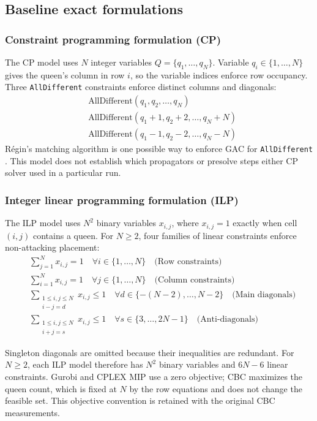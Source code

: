 \documentclass[a4paper,fleqn]{cas-sc}
\begin{document}
\subsection{Baseline exact formulations}

\subsubsection{Constraint programming formulation (CP)}
The CP model uses $N$ integer variables $Q=\{q_1,\dots,q_N\}$. Variable $q_i\in\{1,\dots,N\}$ gives the queen's column in row $i$, so the variable indices enforce row occupancy. Three \texttt{AllDifferent} constraints enforce distinct columns and diagonals:
\begin{align}
& \text{AllDifferent}(q_1, q_2, \dots, q_N) \\
& \text{AllDifferent}(q_1 + 1, q_2 + 2, \dots, q_N + N) \\
& \text{AllDifferent}(q_1 - 1, q_2 - 2, \dots, q_N - N)
\end{align}
Régin's matching algorithm is one possible way to enforce GAC for \texttt{AllDifferent} \cite{regin1994filtering}. This model does not establish which propagators or presolve steps either CP solver used in a particular run.

\subsubsection{Integer linear programming formulation (ILP)}
The ILP model uses $N^2$ binary variables $x_{i,j}$, where $x_{i,j}=1$ exactly when cell $(i,j)$ contains a queen. For $N\geq2$, four families of linear constraints enforce non-attacking placement:
\begin{align}
& \sum_{j=1}^{N} x_{i,j} = 1 \quad \forall i \in \{1, \dots, N\} \quad \text{(Row constraints)} \\
& \sum_{i=1}^{N} x_{i,j} = 1 \quad \forall j \in \{1, \dots, N\} \quad \text{(Column constraints)} \\
& \sum_{\substack{1 \leq i, j \leq N \\ i - j = d}} x_{i,j} \leq 1 \quad \forall d \in \{-(N-2), \dots, N-2\} \quad \text{(Main diagonals)} \\
& \sum_{\substack{1 \leq i, j \leq N \\ i + j = s}} x_{i,j} \leq 1 \quad \forall s \in \{3, \dots, 2N-1\} \quad \text{(Anti-diagonals)}
\end{align}


Singleton diagonals are omitted because their inequalities are redundant. For $N\geq2$, each ILP model therefore has $N^2$ binary variables and $6N-6$ linear constraints. Gurobi and CPLEX MIP use a zero objective; CBC maximizes the queen count, which is fixed at $N$ by the row equations and does not change the feasible set. This objective convention is retained with the original CBC measurements.
\end{document}
